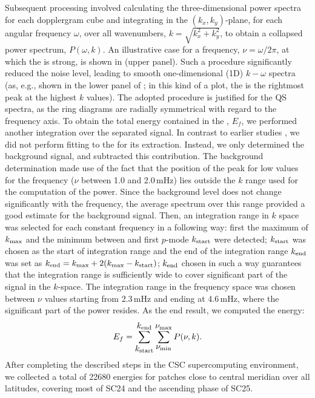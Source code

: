 \documentclass{aa}
\begin{document}
Subsequent processing involved calculating the 
three-dimensional
power spectra for each dopplergram cube and 
integrating
in the $(k_x, k_y)$-plane, for each 
angular
frequency 
$\omega$,
over all wavenumbers, 
$k=\sqrt{k_x^2+k_y^2}$,
to obtain a collapsed power spectrum, 
$P(\omega,k)$. 
An illustrative case for a frequency, $\nu=\omega/2 \pi$,
at which the \fff is strong, is shown in 
 (upper panel).
Such a procedure
significantly reduced the noise level, 
leading to smooth one-dimensional (1D) $k-\omega$ spectra
(as, e.g., shown in the lower panel of ;
in this kind of a plot, the \fff is the rightmost peak at the highest $k$ values).
The adopted procedure
is justified for the 
QS
spectra, as the ring diagrams are radially symmetrical with regard to 
the frequency axis. 
To obtain the total energy contained in the \fffns, $E_f$, we
performed another integration over the separated \fff signal.
In contrast to earlier studies \citep{SRB16,Waidele22}, we
did not perform fitting to the \fff for its extraction. 
Instead, we only determined the background signal, and subtracted this contribution.
The background determination made use of the fact that the position of the \fff peak for low values for 
the frequency ($\nu$ between 1.0 and 2.0\,mHz)
lies outside the $k$ range used for the computation of the \fff power. Since the background level does not change significantly with 
the frequency, the average spectrum over this range provided a good estimate for the background signal.
Then,
an integration range in $k$ space was selected for each constant 
frequency
in a following way: first the maximum of \fff $k_{\rm max}$ and the minimum between \fff and first $p$-mode $k_{\rm start}$ were detected; $k_{\rm start}$ was chosen as the start of integration range and the end of the integration range $k_{\rm end}$ was set as $k_{\rm end}=k_{\rm max}+2(k_{\rm max}-k_{\rm start})$; $k_{\rm end}$ chosen in such a way guarantees that the integration range is sufficiently wide to cover significant part of the \fff 
signal in the $k$-space.
The integration range in the 
frequency space was chosen between $\nu$ values starting from 2.3\,mHz and ending at 4.6\,mHz,
where the significant part of the \fff power resides. 
As the end result, we computed the \fff energy:
\begin{equation}
E_f=
\sum_{\mbox{$k_{\rm start}$}}^{\mbox{$k_{\rm end}$}}
\sum_{\mbox{$\nu_{\rm min}$}}^{\mbox{$\nu_{\rm max}$}} P(\nu,k)
.\end{equation}
After completing the described steps in the CSC supercomputing
environment, we collected a total of 
22680
\fff
energies
for patches close to central meridian over all latitudes, covering 
most of SC24 and the ascending phase of SC25.
\end{document}
